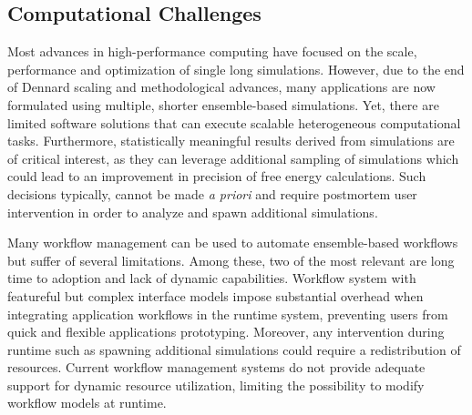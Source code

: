 \subsection{Computational Challenges}




Most advances in high-performance computing have focused on the scale,
performance and optimization of single long simulations. However, due to the
end of Dennard scaling and methodological advances, many applications are now
formulated using multiple, shorter ensemble-based simulations. Yet, there are
limited software solutions that can execute scalable heterogeneous
computational tasks. Furthermore, statistically meaningful results derived
from simulations are of critical interest, as they can leverage additional
sampling of simulations which could lead to an improvement in precision 
of free energy calculations. Such decisions typically, cannot be made {\it a
priori} and require postmortem user intervention in order to analyze and spawn
additional simulations.




Many workflow management can be used to automate ensemble-based workflows but
suffer of several limitations. Among these, two of the most relevant are long
time to adoption and lack of dynamic capabilities.
Workflow system with featureful but complex interface models impose
substantial overhead when integrating application workflows in the runtime
system, preventing users from quick and flexible applications prototyping.
Moreover, any intervention during runtime such as spawning additional 
simulations could require a redistribution of resources.  
Current workflow management systems do not provide adequate
support for dynamic resource utilization, limiting the possibility to modify 
workflow models at runtime. 

